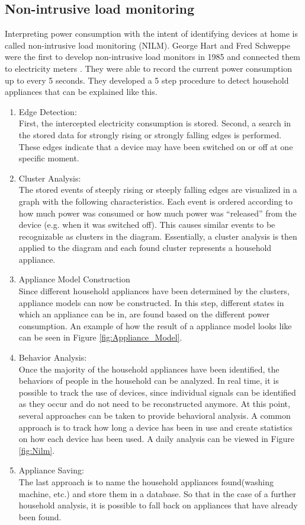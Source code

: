 \subsection{Non-intrusive load monitoring} 
\label{subsec:NILM_sec}
Interpreting power consumption with the intent of identifying devices at home is called non-intrusive load monitoring (NILM). George Hart and Fred Schweppe were the first to develop non-intrusive load monitors in 1985 and connected them to electricity meters \citep{hart1989residential}. They were able to record the current power consumption up to every 5 seconds. They developed a 5 step procedure to detect household appliances that can be explained like this.
\begin{enumerate}
\item Edge Detection:\\
First, the intercepted electricity consumption is stored. Second, a search in the stored data for strongly rising or strongly falling edges is performed. These edges indicate that a device may have been switched on or off at one specific moment.
\item Cluster Analysis:\\ 
The stored events of steeply rising or steeply falling edges are visualized in a graph with the following characteristics. Each event is ordered according to how much power was consumed or how much power was 	``released'' from the device (e.g. when it was switched off). This causes similar events to be recognizable as clusters in the diagram.
Essentially, a cluster analysis is then applied to the diagram and each found cluster represents a household appliance.
\item Appliance Model Construction\\
Since different household appliances have been determined by the clusters, appliance models can now be constructed. In this step, different states in which an appliance can be in, are found based on the different power consumption. An example of how the result of a appliance model looks like can be seen in Figure \ref{fig:Appliance_Model}.
\item Behavior Analysis:\\
Once the majority of the household appliances have been identified, the behaviors of people in the household can be analyzed. In real time, it is possible to track the use of devices, since individual signals can be identified as they occur and do not need to be reconstructed anymore.
At this point, several approaches can be taken to provide behavioral analysis. A common approach is to track how long a device has been in use and create statistics on how each device has been used. A daily analysis can be viewed in Figure \ref{fig:Nilm}.
\item Appliance Saving:\\
The last approach is to name the household appliances found(washing machine, etc.) and store them in a database. So that in the case of a further household analysis, it is possible to fall back on appliances that have already been found.
\end{enumerate}
